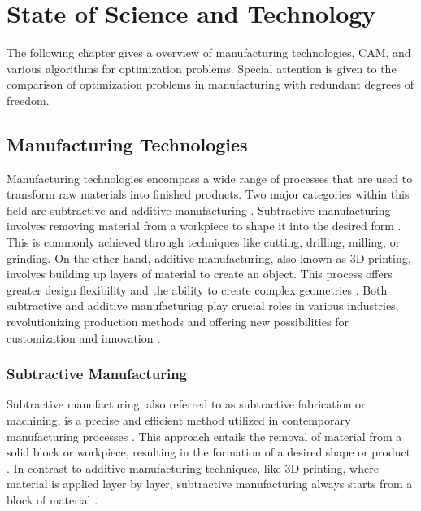 \chapter{State of Science and Technology}%
The following chapter gives a overview of manufacturing technologies, CAM, and various algorithms for optimization problems. Special attention is given to the comparison of optimization problems in manufacturing with redundant degrees of freedom. 
\section{Manufacturing Technologies}
Manufacturing technologies encompass a wide range of processes that are used to transform raw materials into finished products. Two major categories within this field are subtractive and additive manufacturing \cite{Iqbal.2020}. Subtractive manufacturing involves removing material from a workpiece to shape it into the desired form  \cite{Watson.2015}. This is commonly achieved through techniques like cutting, drilling, milling, or grinding. On the other hand, additive manufacturing, also known as 3D printing, involves building up layers of material to create an object. This process offers greater design flexibility and the ability to create complex geometries  \cite{Dilberoglu.2017}. Both subtractive and additive manufacturing play crucial roles in various industries, revolutionizing production methods and offering new possibilities for customization and innovation  \cite{Bandyopadhyay.2020, vanLe.2017}.











\subsection{Subtractive Manufacturing}
Subtractive manufacturing, also referred to as subtractive fabrication or machining, is a precise and efficient method utilized in contemporary manufacturing processes \cite{Wang.2023}. This approach entails the removal of material from a solid block or workpiece, resulting in the formation of a desired shape or product \cite{Calleja.2018}. In contrast to additive manufacturing techniques, like 3D printing, where material is applied layer by layer, subtractive manufacturing always starts from a block of material \cite{Abdulhameed.2019}.

